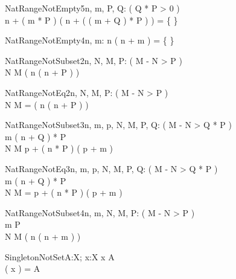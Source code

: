\begin{theorem}{NatRangeNotEmpty5}{n, m, \const P, \const Q: \nat}
\eval( Q * P > 0 ) \\
n + ( m * P ) \upto ( n + ( ( m + Q ) * P ) ) = \{ \}
\end{theorem}

\begin{theorem}{NatRangeNotEmpty4}{n, m: \nat}
n \upto ( n + m ) = \{ \}
\end{theorem}

\begin{theorem}{NatRangeNotSubset2}{n, \const N, \const M, \const P: \nat}
\eval( M - N > P ) \\
N \upto M \subset ( n \upto ( n + P ) )
\end{theorem}

\begin{theorem}{NatRangeNotEq2}{n, \const N, \const M, \const P: \nat}
\eval( M - N > P ) \\
N \upto M = ( n \upto ( n + P ) )
\end{theorem}

\begin{theorem}{NatRangeNotSubset3}{n, m, p, \const N, \const M, \const P, \const Q: \nat}
\eval( M - N > Q * P ) \\
m \leq ( n + Q ) * P \\
N \upto M \subset p + ( n * P ) \upto ( p + m )
\end{theorem}

\begin{theorem}{NatRangeNotEq3}{n, m, p, \const N, \const M, \const P, \const Q: \nat}
\eval( M - N > Q * P ) \\
m \leq ( n + Q ) * P \\
N \upto M = p + ( n * P ) \upto ( p + m )
\end{theorem}

\begin{theorem}{NatRangeNotSubset4}{n, m, \const N, \const M, \const P: \nat}
\eval( M - N > P ) \\
m \leq P \\
N \upto M \subset ( n \upto ( n + m ) )
\end{theorem}


\begin{theorem}{SingletonNotSet}{A:\power X; x:X}
x \notin A \\
\se( x ) = A
\end{theorem}

